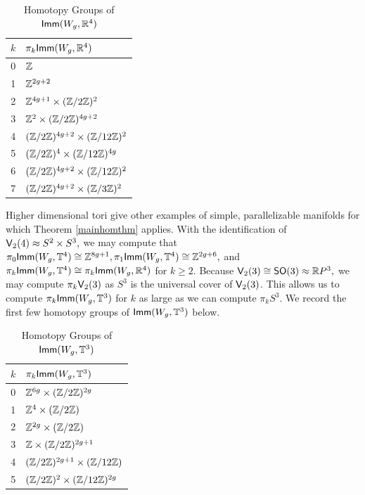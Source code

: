 \begin{table}[h!]
\centering
\begin{tabular}{|| c | m{11em} ||}
\hline
$k$ & $\pi_{k}{\sf Imm}(W_{g}, \mathbb R^{4})$     \\
\hline
0 & $\mathbb Z$  \\
\hline
1 & $\mathbb Z^{2g + 2}$  \\
\hline
2 & $\mathbb Z^{4g + 1} \times (\mathbb Z/2\mathbb Z)^{2}$  \\
\hline
3 & $\mathbb Z^{2} \times (\mathbb Z/2\mathbb Z)^{4g + 2}$  \\
\hline
4 & $(\mathbb Z/2\mathbb Z)^{4g + 2} \times (\mathbb Z/12\mathbb Z)^{2}$ \\
\hline
5 & $(\mathbb Z/2\mathbb Z)^{4} \times (\mathbb Z/12\mathbb Z)^{4g}$ \\
\hline
6 & $(\mathbb Z/2\mathbb Z)^{4g + 2} \times (\mathbb Z/12\mathbb Z)^{2}$ \\
\hline
7 & $(\mathbb Z/2\mathbb Z)^{4g + 2} \times (\mathbb Z/3\mathbb Z)^{2}$ \\
\hline
\end{tabular}
\caption{Homotopy Groups of ${\sf Imm}(W_{g}, \mathbb R^{4})$}
\label{table:1}
\end{table}


Higher dimensional tori give other examples of simple, parallelizable manifolds for which Theorem \ref{mainhomthm} applies. With the identification of $\mathsf V_{2}(4) \approx S^{2} \times S^{3},$ we may compute that $\pi_{0}{\sf Imm}(W_{g}, \mathbb T^{4}) \cong \mathbb Z^{8g + 1}, \pi_{1}{\sf Imm}(W_{g}, \mathbb T^{4}) \cong \mathbb Z^{2g + 6},$ and $\pi_{k}{\sf Imm}(W_{g}, \mathbb T^{4}) \cong \pi_{k}{\sf Imm}(W_{g}, \mathbb R^{4})$ for $k \geq 2.$ Because $\mathsf V_{2}(3) \cong {\sf SO}(3) \approx \mathbb R P^{3},$ we may compute $\pi_{k}\mathsf V_{2}(3)$ as $S^{3}$ is the universal cover of $\mathsf V_{2}(3)$. This allows us to compute $\pi_{k}{\sf Imm}(W_{g}, \mathbb T^{3})$ for $k$ as large as we can compute $\pi_{k}S^{3}.$ We record the first few homotopy groups of ${\sf Imm}(W_{g}, \mathbb T^{3})$ below.

\begin{table}[h!]
\centering
\begin{tabular}{|| c | m{11em} ||}
\hline
$k$ & $\pi_{k}{\sf Imm}(W_{g}, \mathbb T^{3})$     \\
\hline
0 & $\mathbb Z^{6g} \times (\mathbb Z/2\mathbb Z)^{2g}$ \\
\hline
1 & $\mathbb Z^{4} \times (\mathbb Z/2\mathbb Z) $  \\
\hline
2 & $\mathbb Z^{2g} \times (\mathbb Z/2\mathbb Z)$  \\
\hline
3 & $\mathbb Z \times (\mathbb Z/2\mathbb Z)^{2g + 1}$  \\
\hline
4 & $(\mathbb Z/2\mathbb Z)^{2g + 1} \times (\mathbb Z/12\mathbb Z)$ \\
\hline
5 & $(\mathbb Z/2\mathbb Z)^{2} \times (\mathbb Z/12\mathbb Z)^{2g}$ \\
\hline
\end{tabular}
\caption{Homotopy Groups of ${\sf Imm}(W_{g}, \mathbb T^{3})$}
\label{table:11}
\end{table}

